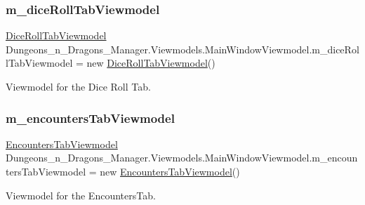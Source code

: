 \subsubsection{\texorpdfstring{m\+\_\+dice\+Roll\+Tab\+Viewmodel}{m\_diceRollTabViewmodel}}
{\footnotesize\ttfamily \mbox{\hyperlink{class_dungeons__n___dragons___manager_1_1_viewmodels_1_1_dice_roll_tab_viewmodel}{Dice\+Roll\+Tab\+Viewmodel}} Dungeons\+\_\+n\+\_\+\+Dragons\+\_\+\+Manager.\+Viewmodels.\+Main\+Window\+Viewmodel.\+m\+\_\+dice\+Roll\+Tab\+Viewmodel = new \mbox{\hyperlink{class_dungeons__n___dragons___manager_1_1_viewmodels_1_1_dice_roll_tab_viewmodel}{Dice\+Roll\+Tab\+Viewmodel}}()\hspace{0.3cm}{\ttfamily [private]}}



Viewmodel for the Dice Roll Tab. 

\mbox{\label{class_dungeons__n___dragons___manager_1_1_viewmodels_1_1_main_window_viewmodel_a81376780a92429cfa6e1d10ed7747f5d}} 
\subsubsection{\texorpdfstring{m\+\_\+encounters\+Tab\+Viewmodel}{m\_encountersTabViewmodel}}
{\footnotesize\ttfamily \mbox{\hyperlink{class_dungeons__n___dragons___manager_1_1_viewmodels_1_1_encounters_tab_viewmodel}{Encounters\+Tab\+Viewmodel}} Dungeons\+\_\+n\+\_\+\+Dragons\+\_\+\+Manager.\+Viewmodels.\+Main\+Window\+Viewmodel.\+m\+\_\+encounters\+Tab\+Viewmodel = new \mbox{\hyperlink{class_dungeons__n___dragons___manager_1_1_viewmodels_1_1_encounters_tab_viewmodel}{Encounters\+Tab\+Viewmodel}}()\hspace{0.3cm}{\ttfamily [private]}}



Viewmodel for the Encounters\+Tab. 



